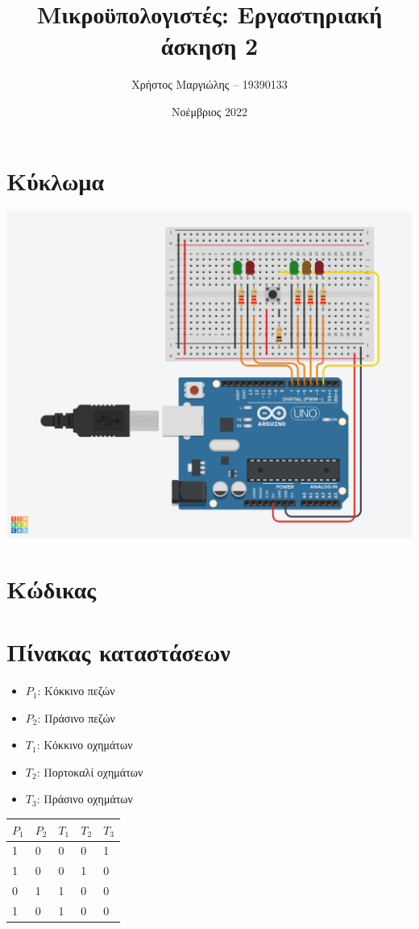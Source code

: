 \documentclass{article}
\title{Μικροϋπολογιστές: Εργαστηριακή άσκηση 2}
\author{Χρήστος Μαργιώλης -- 19390133}
\date{Νοέμβριος 2022}
\begin{document}
\begin{titlepage}
        \maketitle
\end{titlepage}

\section{Κύκλωμα}

\includegraphics[width=\linewidth]{traffic.png}
\pagebreak

\section{Κώδικας}



\section{Πίνακας καταστάσεων}

\begin{itemize}
	\item $P_1$: Κόκκινο πεζών
	\item $P_2$: Πράσινο πεζών
	\item $T_1$: Κόκκινο οχημάτων
	\item $T_2$: Πορτοκαλί οχημάτων
	\item $T_3$: Πράσινο οχημάτων
\end{itemize}

\begin{center}
\begin{tabular}{|l|l|l|l|l|}
	\hline
	$P_1$ & $P_2$ & $T_1$ & $T_2$ & $T_3$ \\
	\hline
	1 & 0 & 0 & 0 & 1 \\
	\hline
	1 & 0 & 0 & 1 & 0 \\
	\hline
	0 & 1 & 1 & 0 & 0 \\
	\hline
	1 & 0 & 1 & 0 & 0 \\
	\hline
\end{tabular}
\end{center}
\end{document}
